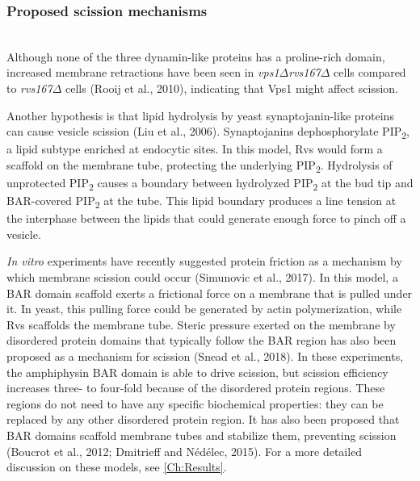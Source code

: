 
		
			\subsubsection{Proposed scission mechanisms}
			\mbox{}\\
			Although none of the three dynamin-like proteins has a proline-rich domain, increased membrane retractions have been seen in \textit{vps1$\Delta$}\textit{rvs167$\Delta$} cells compared to \textit{rvs167$\Delta$}  cells (Rooij et al., 2010), indicating that Vps1 might affect scission. 

			\vspace{5mm}
Another hypothesis is that lipid hydrolysis by yeast synaptojanin-like proteins can cause vesicle scission (Liu et al., 2006). Synaptojanins dephosphorylate PIP\textsubscript{2}, a lipid subtype enriched at endocytic sites. In this model, Rvs would form a scaffold on the membrane tube, protecting the underlying PIP\textsubscript{2}. Hydrolysis of unprotected PIP\textsubscript{2} causes a boundary between hydrolyzed PIP\textsubscript{2} at the bud tip and BAR-covered PIP\textsubscript{2} at the tube. This lipid boundary produces a line tension at the interphase between the lipids that could generate enough force to pinch off a vesicle. 


			\vspace{5mm}
\textit{In vitro} experiments have recently suggested protein friction as a mechanism by which membrane scission could occur (Simunovic et al., 2017). In this model, a BAR domain scaffold exerts a frictional force on a membrane that is pulled under it. In yeast, this pulling force could be generated by actin polymerization, while Rvs scaffolds the membrane tube. 
Steric pressure exerted on the membrane by disordered protein domains that typically follow the BAR region has also been proposed as a mechanism for scission (Snead et al., 2018). In these experiments, the amphiphysin BAR domain is able to drive scission, but scission efficiency increases three- to four-fold because of the disordered protein regions. These regions do not need to have any specific biochemical properties: they can be replaced by any other disordered protein region. It has also been proposed that BAR domains scaffold membrane tubes and stabilize them, preventing scission (Boucrot et al., 2012; Dmitrieff and Nédélec, 2015). For a more detailed discussion on these models, see \ref{Ch:Results}.

